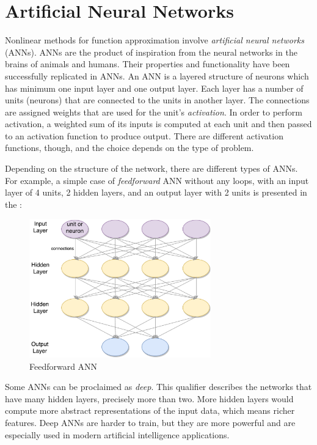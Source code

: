 \section{Artificial Neural Networks}\label{ANNsection}
Nonlinear methods for function approximation involve \textit{artificial neural networks} (ANNs). ANNs are the product of inspiration from the neural networks in the brains of animals and humans. Their properties and functionality have been successfully replicated in ANNs. An ANN is a layered structure of neurons which has minimum one input layer and one output layer. Each layer has a number of units (neurons) that are connected to the units in another layer. The connections are assigned weights that are used for the unit's \textit{activation}. In order to perform activation, a weighted sum of its inputs is computed at each unit and then passed to an activation function to produce output. There are different activation functions, though, and the choice depends on the type of problem.

Depending on the structure of the network, there are different types of ANNs. For example, a simple case of \textit{feedforward} ANN without any loops, with an input layer of 4 units, 2 hidden layers, and an output layer with 2 units is presented in the :
\begin{figure}[H]
	\centering
	\includegraphics[width=0.7\textwidth]{Figures/Feedforward}
	\caption{Feedforward ANN}
	\label{fig:feedforward}
\end{figure}
Some ANNs can be proclaimed as \textit{deep}. This qualifier describes the networks that have many hidden layers, precisely more than two. More hidden layers would compute more abstract representations of the input data, which means richer features. Deep ANNs are harder to train, but they are more powerful and are especially used in modern artificial intelligence applications.

